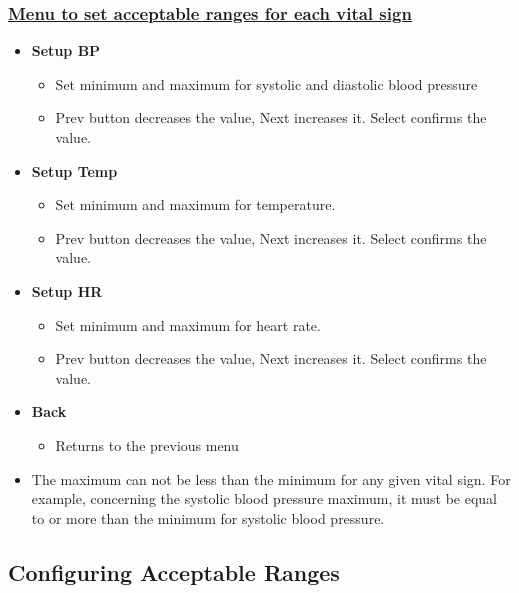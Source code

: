 \subsubsection{\underline{Menu to set acceptable ranges for each vital sign}}
\begin{itemize}
	\item \textbf{Setup BP}
	\begin{itemize}
		\item Set minimum and maximum for systolic and diastolic blood pressure
		\item Prev button decreases the value, Next increases it. Select confirms the value.
	\end{itemize}
	\item \textbf{Setup Temp}
	\begin{itemize}
		\item Set minimum and maximum for temperature.
		\item Prev button decreases the value, Next increases it. Select confirms the value.
	\end{itemize}
	\item \textbf{Setup HR}
	\begin{itemize}
		\item Set minimum and maximum for heart rate.
		\item Prev button decreases the value, Next increases it. Select confirms the value.
	\end{itemize}
	\item \textbf{Back}
	\begin{itemize}
		\item Returns to the previous menu
	\end{itemize}

	\item The maximum can not be less than the minimum for any given vital sign. For example, concerning the systolic blood pressure maximum, it must be equal to or more than the minimum for systolic blood pressure.
\end{itemize}

\subsection{Configuring Acceptable Ranges}
